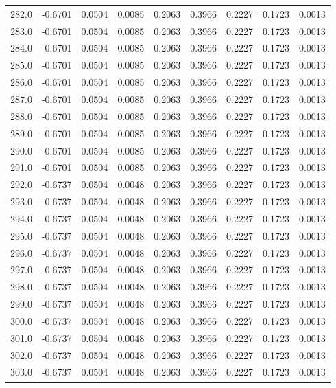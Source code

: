 \begin{longtable}{lrrrrrrrr}
282.0 & -0.6701 & 0.0504 & 0.0085 & 0.2063 & 0.3966 & 0.2227 & 0.1723 & 0.0013 \\
283.0 & -0.6701 & 0.0504 & 0.0085 & 0.2063 & 0.3966 & 0.2227 & 0.1723 & 0.0013 \\
284.0 & -0.6701 & 0.0504 & 0.0085 & 0.2063 & 0.3966 & 0.2227 & 0.1723 & 0.0013 \\
285.0 & -0.6701 & 0.0504 & 0.0085 & 0.2063 & 0.3966 & 0.2227 & 0.1723 & 0.0013 \\
286.0 & -0.6701 & 0.0504 & 0.0085 & 0.2063 & 0.3966 & 0.2227 & 0.1723 & 0.0013 \\
287.0 & -0.6701 & 0.0504 & 0.0085 & 0.2063 & 0.3966 & 0.2227 & 0.1723 & 0.0013 \\
288.0 & -0.6701 & 0.0504 & 0.0085 & 0.2063 & 0.3966 & 0.2227 & 0.1723 & 0.0013 \\
289.0 & -0.6701 & 0.0504 & 0.0085 & 0.2063 & 0.3966 & 0.2227 & 0.1723 & 0.0013 \\
290.0 & -0.6701 & 0.0504 & 0.0085 & 0.2063 & 0.3966 & 0.2227 & 0.1723 & 0.0013 \\
291.0 & -0.6701 & 0.0504 & 0.0085 & 0.2063 & 0.3966 & 0.2227 & 0.1723 & 0.0013 \\
292.0 & -0.6737 & 0.0504 & 0.0048 & 0.2063 & 0.3966 & 0.2227 & 0.1723 & 0.0013 \\
293.0 & -0.6737 & 0.0504 & 0.0048 & 0.2063 & 0.3966 & 0.2227 & 0.1723 & 0.0013 \\
294.0 & -0.6737 & 0.0504 & 0.0048 & 0.2063 & 0.3966 & 0.2227 & 0.1723 & 0.0013 \\
295.0 & -0.6737 & 0.0504 & 0.0048 & 0.2063 & 0.3966 & 0.2227 & 0.1723 & 0.0013 \\
296.0 & -0.6737 & 0.0504 & 0.0048 & 0.2063 & 0.3966 & 0.2227 & 0.1723 & 0.0013 \\
297.0 & -0.6737 & 0.0504 & 0.0048 & 0.2063 & 0.3966 & 0.2227 & 0.1723 & 0.0013 \\
298.0 & -0.6737 & 0.0504 & 0.0048 & 0.2063 & 0.3966 & 0.2227 & 0.1723 & 0.0013 \\
299.0 & -0.6737 & 0.0504 & 0.0048 & 0.2063 & 0.3966 & 0.2227 & 0.1723 & 0.0013 \\
300.0 & -0.6737 & 0.0504 & 0.0048 & 0.2063 & 0.3966 & 0.2227 & 0.1723 & 0.0013 \\
301.0 & -0.6737 & 0.0504 & 0.0048 & 0.2063 & 0.3966 & 0.2227 & 0.1723 & 0.0013 \\
302.0 & -0.6737 & 0.0504 & 0.0048 & 0.2063 & 0.3966 & 0.2227 & 0.1723 & 0.0013 \\
303.0 & -0.6737 & 0.0504 & 0.0048 & 0.2063 & 0.3966 & 0.2227 & 0.1723 & 0.0013 \\

\end{longtable}
